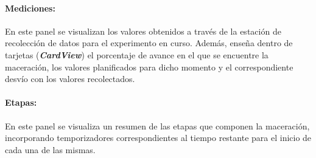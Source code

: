             \paragraph{Mediciones:}
            En este panel se visualizan los valores obtenidos a través de la estación de recolección de datos para el experimento en curso. Además, enseña dentro de tarjetas (\textbf{\textit{CardView}}) el porcentaje de avance en el que se encuentre la maceración, los valores planificados para dicho momento y el correspondiente desvío con los valores recolectados.
            \paragraph{Etapas:}
            En este panel se visualiza un resumen de las etapas que componen la maceración, incorporando temporizadores correspondientes al tiempo restante para el inicio de cada una de las mismas.
            
